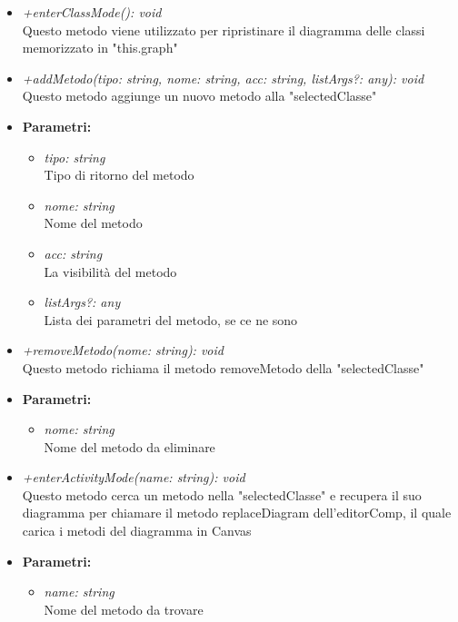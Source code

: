 \begin{itemize}
\begin{itemize}
            			\item \emph{+enterClassMode(): void}\\
          				Questo metodo viene utilizzato per ripristinare il diagramma delle classi memorizzato in "this.graph"
          				\item \emph{+addMetodo(tipo: string, nome: string, acc: string, listArgs?: any): void}\\
          				Questo metodo aggiunge un nuovo metodo alla "selectedClasse"
          				\item \textbf{Parametri:}\\
            				\begin{itemize}
            					\item \emph{tipo: string}\\
            					Tipo di ritorno del metodo
            					\item \emph{nome: string}\\
            					Nome del metodo
            					\item \emph{acc: string}\\
            					La visibilità del metodo
            					\item \emph{listArgs?: any}\\
            					Lista dei parametri del metodo, se ce ne sono
            				\end{itemize}
            			\item \emph{+removeMetodo(nome: string): void}\\
          				Questo metodo richiama il metodo removeMetodo della "selectedClasse"
          				\item \textbf{Parametri:}\\
            				\begin{itemize}
            					\item \emph{nome: string}\\
            					Nome del metodo da eliminare
            				\end{itemize}
            			\item \emph{+enterActivityMode(name: string): void}\\
          				Questo metodo cerca un metodo nella "selectedClasse" e recupera il suo diagramma per chiamare il metodo replaceDiagram dell'editorComp, il quale carica i metodi del diagramma in Canvas
          				\item \textbf{Parametri:}\\
            				\begin{itemize}
            					\item \emph{name: string}\\
            					Nome del metodo da trovare
            				\end{itemize}
          			\end{itemize}
          		\end{itemize}
